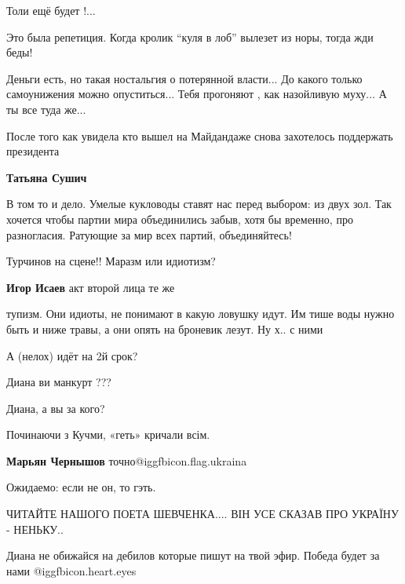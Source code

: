 \begin{itemize}
Толи ещё будет !...

Это была репетиция. Когда кролик \enquote{куля в лоб} вылезет из норы, тогда жди беды!


Деньги есть, но такая ностальгия о потерянной власти...
До какого только самоунижения можно опуститься... Тебя прогоняют , как назойливую муху...
А ты все туда же...

После того как увидела кто вышел на Майдандаже снова захотелось поддержать президента

\begin{itemize} %
\textbf{Татьяна Сушич} 

В том то и дело. Умелые кукловоды ставят нас перед выбором: из двух зол. Так
хочется чтобы партии мира объединились забыв, хотя бы временно, про
разногласия. Ратующие за мир всех партий, объединяйтесь!

\end{itemize} %

Турчинов на сцене!! Маразм или идиотизм?

\begin{itemize} %
\textbf{Игор Исаев} акт второй лица те же


тупизм. Они идиоты, не понимают в какую ловушку идут.
Им тише воды нужно быть и ниже травы, а они опять на броневик лезут. Ну х.. с
ними

\end{itemize} %

А (нелох) идёт на 2й срок?

Диана ви манкурт ???

Диана, а вы за кого?

Починаючи з Кучми, «геть» кричали всім.

\textbf{Марьян Чернышов} точно@igg{fbicon.flag.ukraina}

Ожидаемо: если не он, то гэть.

ЧИТАЙТЕ НАШОГО ПОЕТА ШЕВЧЕНКА....
ВІН УСЕ СКАЗАВ ПРО УКРАЇНУ - НЕНЬКУ..

Диана не обижайся на дебилов которые пишут на твой эфир. Победа будет за нами @igg{fbicon.heart.eyes} 


\end{itemize}
